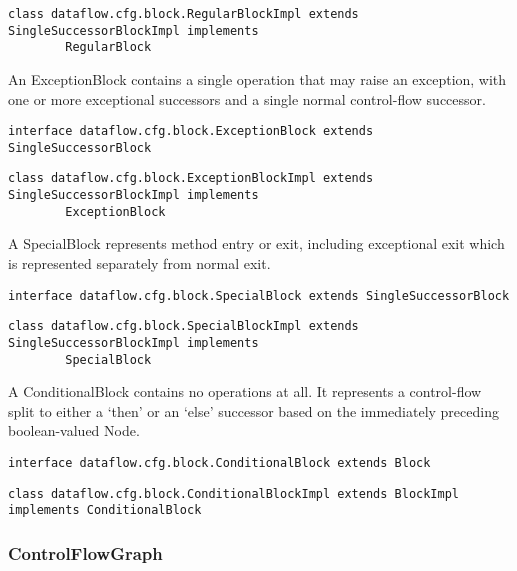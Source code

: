     \begin{verbatim}class dataflow.cfg.block.RegularBlockImpl extends SingleSuccessorBlockImpl implements
        RegularBlock\end{verbatim}
        
    An ExceptionBlock contains a single operation that may raise an exception, with one or more exceptional successors and a single normal control-flow successor.
            
    \begin{verbatim}interface dataflow.cfg.block.ExceptionBlock extends SingleSuccessorBlock\end{verbatim}

    \begin{verbatim}class dataflow.cfg.block.ExceptionBlockImpl extends SingleSuccessorBlockImpl implements
        ExceptionBlock\end{verbatim}
        
    A SpecialBlock represents method entry or exit, including exceptional
    exit which is represented separately from normal exit.

    \begin{verbatim}interface dataflow.cfg.block.SpecialBlock extends SingleSuccessorBlock\end{verbatim}

    \begin{verbatim}class dataflow.cfg.block.SpecialBlockImpl extends SingleSuccessorBlockImpl implements
        SpecialBlock\end{verbatim}

    A ConditionalBlock contains no operations at all.  It represents a control-flow split to either a `then' or an `else' successor based on the immediately preceding boolean-valued Node.

    \begin{verbatim}interface dataflow.cfg.block.ConditionalBlock extends Block\end{verbatim}
    
    \begin{verbatim}class dataflow.cfg.block.ConditionalBlockImpl extends BlockImpl implements ConditionalBlock\end{verbatim}
    


\subsubsection{ControlFlowGraph}
\label{sec:control_flow_graph_class}

